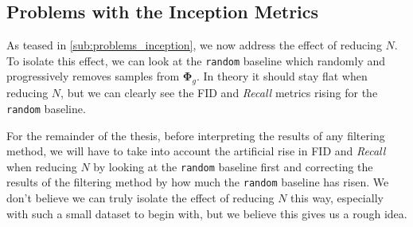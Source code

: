 \subsection{Problems with the Inception Metrics}
\label{sub:show_n_inception_problem}

As teased in \autoref{sub:problems_inception}, we now address the effect of reducing $N$. To isolate this effect, we can look at the \texttt{random} baseline which randomly and progressively removes samples from $\boldsymbol\Phi_g$. In theory it should stay flat when reducing $N$, but we can clearly see the \acs{FID} and \emph{Recall} metrics rising for the \texttt{random} baseline.

\begin{tcolorbox}[colback=red!10!white,colframe=red!50!black,sharp corners]
For the remainder of the thesis, before interpreting the results of any filtering method, we will have to take into account the artificial rise in \acs{FID} and \emph{Recall} when reducing $N$ by looking at the \texttt{random} baseline first and correcting the results of the filtering method by how much the \texttt{random} baseline has risen.
\warning We don't believe we can truly isolate the effect of reducing $N$ this way, especially with such a small dataset to begin with, but we believe this gives us a rough idea.
\end{tcolorbox}



